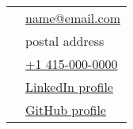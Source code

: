 \vspace{2mm}
\begin{xltabular}{0.7\textwidth}[c]{W X}
	
	\href{mailto:name@email.com}{\faEnvelopeSquare} & \href{mailto:name@email.com}{name@email.com} \\
	\faHome & postal address \\
	\href{tel:14150000000}{\faPhoneSquare} & \href{tel:14150000000}{+1 415-000-0000} \\
	\href{https://www.linkedin.com}{\faLinkedinSquare} & \href{https://www.linkedin.com}{LinkedIn profile} \\
	\href{https://github.com}{\faGithubSquare} & \href{https://www.linkedin.com}{GitHub profile} \\
	
\end{xltabular}
